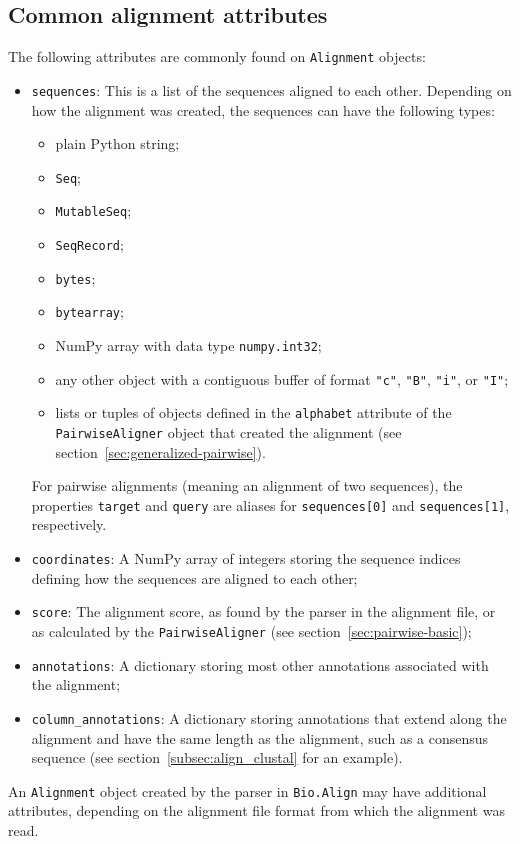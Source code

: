 \subsection{Common alignment attributes}
\label{subsec:align_common_attributes}

The following attributes are commonly found on \verb|Alignment| objects:
\begin{itemize}
\item \verb|sequences|: This is a list of the sequences aligned to each other. Depending on how the alignment was created, the sequences can have the following types:
\begin{itemize}
\item plain Python string;
\item \verb|Seq|;
\item \verb|MutableSeq|;
\item \verb|SeqRecord|;
\item \verb|bytes|;
\item \verb|bytearray|;
\item NumPy array with data type \verb|numpy.int32|;
\item any other object with a contiguous buffer of format \verb|"c"|, \verb|"B"|, \verb|"i"|, or \verb|"I"|;
\item lists or tuples of objects defined in the \verb|alphabet| attribute of the \verb|PairwiseAligner| object that created the alignment (see section~\ref{sec:generalized-pairwise}).
\end{itemize}
For pairwise alignments (meaning an alignment of two sequences), the properties \verb|target| and \verb|query| are aliases for \verb|sequences[0]| and \verb|sequences[1]|, respectively.
\item \verb|coordinates|: A NumPy array of integers storing the sequence indices defining how the sequences are aligned to each other;
\item \verb|score|: The alignment score, as found by the parser in the alignment file, or as calculated by the \verb|PairwiseAligner| (see section~\ref{sec:pairwise-basic});
\item \verb|annotations|: A dictionary storing most other annotations associated with the alignment;
\item \verb|column_annotations|: A dictionary storing annotations that extend along the alignment and have the same length as the alignment, such as a consensus sequence (see section~\ref{subsec:align_clustal} for an example).
\end{itemize}
An \verb|Alignment| object created by the parser in \verb|Bio.Align| may have additional attributes, depending on the alignment file format from which the alignment was read.


